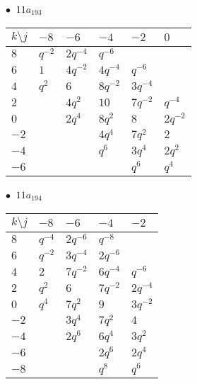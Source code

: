 \begin{minipage}{\linewidth}
$\bullet\ $ $11a_{193}$ \vspace{0.5em} \\
\begin{tabular}{l|lllll}
$k \setminus j$ & $-8$ & $-6$ & $-4$ & $-2$ & $0$ \\
\hline
$8$ & $q^{-2}$ & $2q^{-4}$ & $q^{-6}$ &  &  \\
$6$ & $1$ & $4q^{-2}$ & $4q^{-4}$ & $q^{-6}$ &  \\
$4$ & $q^{2}$ & $6$ & $8q^{-2}$ & $3q^{-4}$ &  \\
$2$ &  & $4q^{2}$ & $10$ & $7q^{-2}$ & $q^{-4}$ \\
$0$ &  & $2q^{4}$ & $8q^{2}$ & $8$ & $2q^{-2}$ \\
$-2$ &  &  & $4q^{4}$ & $7q^{2}$ & $2$ \\
$-4$ &  &  & $q^{6}$ & $3q^{4}$ & $2q^{2}$ \\
$-6$ &  &  &  & $q^{6}$ & $q^{4}$ \\
\end{tabular}
\vspace{2em}
\end{minipage}
%
\begin{minipage}{\linewidth}
$\bullet\ $ $11a_{194}$ \vspace{0.5em} \\
\begin{tabular}{l|llll}
$k \setminus j$ & $-8$ & $-6$ & $-4$ & $-2$ \\
\hline
$8$ & $q^{-4}$ & $2q^{-6}$ & $q^{-8}$ &  \\
$6$ & $q^{-2}$ & $3q^{-4}$ & $2q^{-6}$ &  \\
$4$ & $2$ & $7q^{-2}$ & $6q^{-4}$ & $q^{-6}$ \\
$2$ & $q^{2}$ & $6$ & $7q^{-2}$ & $2q^{-4}$ \\
$0$ & $q^{4}$ & $7q^{2}$ & $9$ & $3q^{-2}$ \\
$-2$ &  & $3q^{4}$ & $7q^{2}$ & $4$ \\
$-4$ &  & $2q^{6}$ & $6q^{4}$ & $3q^{2}$ \\
$-6$ &  &  & $2q^{6}$ & $2q^{4}$ \\
$-8$ &  &  & $q^{8}$ & $q^{6}$ \\
\end{tabular}
\vspace{2em}
\end{minipage}
%
